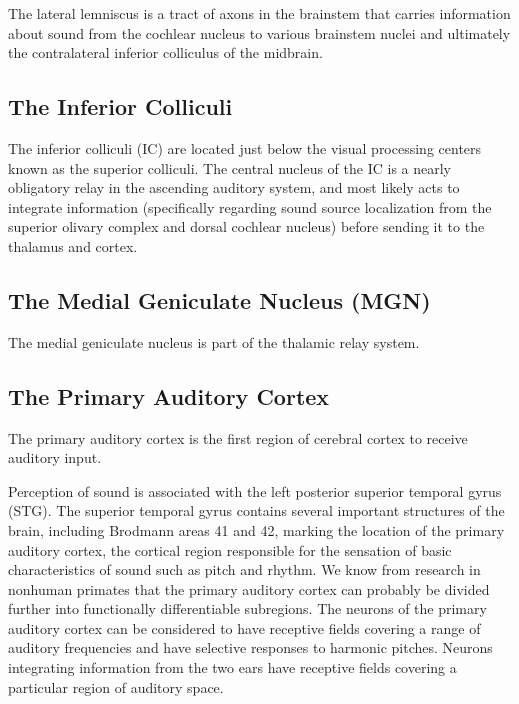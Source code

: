 The lateral lemniscus is a tract of axons in the brainstem that carries information about sound from the cochlear nucleus to various brainstem nuclei and ultimately the contralateral inferior colliculus of the midbrain.

\hypertarget{the-inferior-colliculi}{%
\subsection{The Inferior Colliculi}\label{the-inferior-colliculi}}

The inferior colliculi (IC) are located just below the visual processing centers known as the superior colliculi. The central nucleus of the IC is a nearly obligatory relay in the ascending auditory system, and most likely acts to integrate information (specifically regarding sound source localization from the superior olivary complex and dorsal cochlear nucleus) before sending it to the thalamus and cortex.

\hypertarget{the-medial-geniculate-nucleus-mgn}{%
\subsection{The Medial Geniculate Nucleus (MGN)}\label{the-medial-geniculate-nucleus-mgn}}

The medial geniculate nucleus is part of the thalamic relay system.

\hypertarget{the-primary-auditory-cortex}{%
\subsection{The Primary Auditory Cortex}\label{the-primary-auditory-cortex}}

The primary auditory cortex is the first region of cerebral cortex to receive auditory input.

Perception of sound is associated with the left posterior superior temporal gyrus (STG). The superior temporal gyrus contains several important structures of the brain, including Brodmann areas 41 and 42, marking the location of the primary auditory cortex, the cortical region responsible for the sensation of basic characteristics of sound such as pitch and rhythm. We know from research in nonhuman primates that the primary auditory cortex can probably be divided further into functionally differentiable subregions. The neurons of the primary auditory cortex can be considered to have receptive fields covering a range of auditory frequencies and have selective responses to harmonic pitches. Neurons integrating information from the two ears have receptive fields covering a particular region of auditory space.

